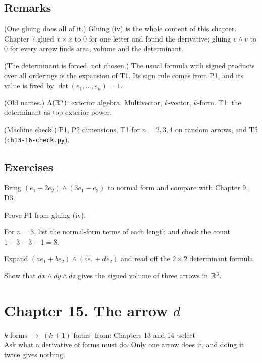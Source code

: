 \subsection*{Remarks}

\begin{lines}
\item[\lab{R1}] (One gluing does all of it.) Gluing (iv) is the whole content of this chapter. Chapter 7 glued $x \times x$ to $0$ for one letter and found the derivative; gluing $v \wedge v$ to $0$ for every arrow finds area, volume and the determinant.
\item[\lab{R2}] (The determinant is forced, not chosen.) The usual formula with signed products over all orderings is the expansion of T1. Its sign rule comes from P1, and its value is fixed by $\det(e_1, \dots, e_n) = 1$.
\item[\lab{R3}] (Old names.) $\Lambda(\mathbb{R}^n)$: exterior algebra. Multivector, $k$-vector, $k$-form. T1: the determinant as top exterior power.
\item[\lab{R4}] (Machine check.) P1, P2 dimensions, T1 for $n = 2, 3, 4$ on random arrows, and T5 (\texttt{ch13-16-check.py}).
\end{lines}

\subsection*{Exercises}

\begin{lines}
\item[\lab{E1}] Bring $(e_1 + 2e_2) \wedge (3e_1 - e_2)$ to normal form and compare with Chapter 9, D3.
\item[\lab{E2}] Prove P1 from gluing (iv).
\item[\lab{E3}] For $n = 3$, list the normal-form terms of each length and check the count $1 + 3 + 3 + 1 = 8$.
\item[\lab{E4}] Expand $(a e_1 + b e_2) \wedge (c e_1 + d e_2)$ and read off the $2 \times 2$ determinant formula.
\item[\lab{E5}] Show that $dx \wedge dy \wedge dz$ gives the signed volume of three arrows in $\mathbb{R}^3$.
\end{lines}

\newpage

\section*{Chapter 15. The arrow $d$}
\begin{center}
{\normalsize $k$-forms $\to$ $(k{+}1)$-forms \quad$\cdot$\quad from: Chapters 13 and 14 \quad$\cdot$\quad select}\\[4pt]
{\small Ask what a derivative of forms must do. Only one arrow does it, and doing it twice gives nothing.}
\end{center}

